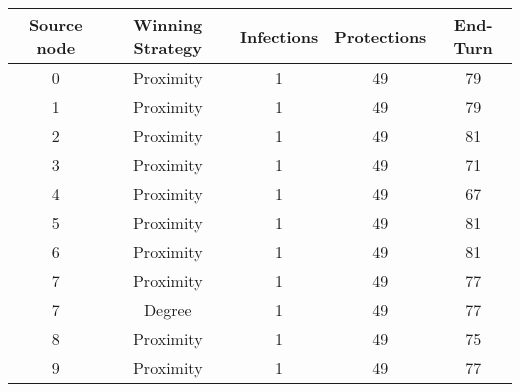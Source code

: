 \documentclass[results.tex]{subfiles}
\begin{document}
    \begin{center}
        \begin{tabular}{| c || c | c | c | c |}
            \hline
            {\bfseries Source node} & {\bfseries Winning Strategy} & {\bfseries Infections} & {\bfseries Protections}
            & {\bfseries End-Turn}
            \\  %
            \hline\hline
            0                       & Proximity                    & 1                      & 49                      & 79                   \\
            \hline
            1                       & Proximity                    & 1                      & 49                      & 79                   \\
            \hline
            2                       & Proximity                    & 1                      & 49                      & 81                   \\
            \hline
            3                       & Proximity                    & 1                      & 49                      & 71                   \\
            \hline
            4                       & Proximity                    & 1                      & 49                      & 67                   \\
            \hline
            5                       & Proximity                    & 1                      & 49                      & 81                   \\
            \hline
            6                       & Proximity                    & 1                      & 49                      & 81                   \\
            \hline
            7                       & Proximity                    & 1                      & 49                      & 77                   \\
            \hline
            7                       & Degree                       & 1                      & 49                      & 77                   \\
            \hline
            8                       & Proximity                    & 1                      & 49                      & 75                   \\
            \hline
            9                       & Proximity                    & 1                      & 49                      & 77                   \\

\end{tabular}
\end{center}
\end{document}
